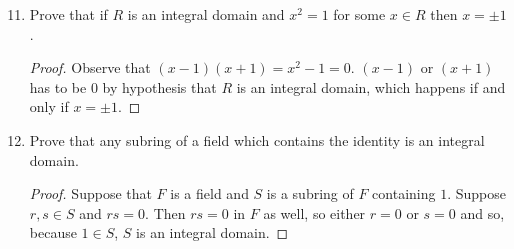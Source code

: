 \documentclass{report}
\begin{document}
\begin{enumerate}
    \setcounter{enumi}{10}
    \item Prove that if $R$ is an integral domain and $x^2=1$ for some $x\in R$ then $x=\pm 1$.
    \begin{proof}
        Observe that $(x-1)(x+1)=x^2-1=0$. $(x-1)$ or $(x+1)$ has to be $0$ by hypothesis that $R$ is an integral domain, which happens if and only if $x=\pm 1$.
    \end{proof}


    \item Prove that any subring of a field which contains the identity is an integral domain.

    \begin{proof}
        Suppose that $F$ is a field and $S$ is a subring of $F$ containing $1$. Suppose $r,s\in S$ and $rs=0$. Then $rs=0$ in $F$ as well, so either $r=0$ or $s=0$ and so, because $1\in S$, $S$ is an integral domain.
    \end{proof}
\end{enumerate}
\end{document}

